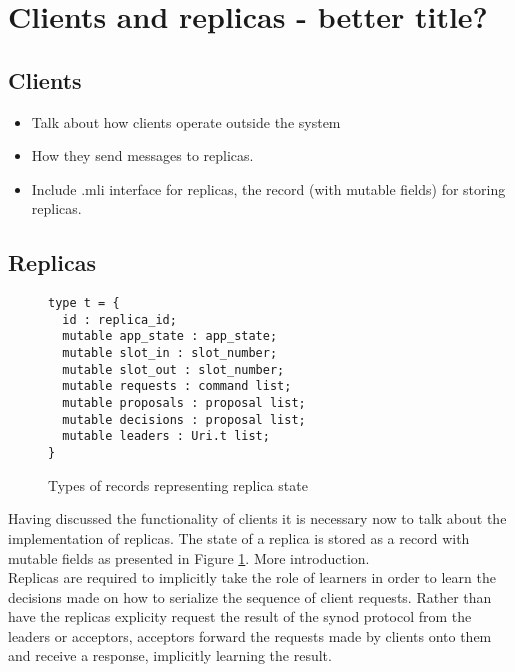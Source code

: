 \section{Clients and replicas - better title?}

{\color{green}
\subsection{Clients}
\begin{itemize}
  \item Talk about how clients operate outside the system
  \item How they send messages to replicas.
  \item Include .mli interface for replicas, the record (with mutable fields) for storing replicas.
\end{itemize}
}

\subsection{Replicas}

\begin{figure}
\begin{lstlisting}
type t = {
  id : replica_id;
  mutable app_state : app_state;
  mutable slot_in : slot_number;
  mutable slot_out : slot_number;
  mutable requests : command list;
  mutable proposals : proposal list;
  mutable decisions : proposal list;
  mutable leaders : Uri.t list;
}
\end{lstlisting}
\centering
\caption{Types of records representing replica state}
\label{fig:replica-types}
\end{figure}

Having discussed the functionality of clients it is necessary now to talk about the implementation of replicas. The state of a replica is stored as a record with mutable fields as presented in Figure \ref{fig:replica-types}. More introduction. \\

Replicas are required to implicitly take the role of learners in order to learn the decisions made on how to serialize the sequence of client requests. Rather than have the replicas explicity request the result of the synod protocol from the leaders or acceptors, acceptors forward the requests made by clients onto them and receive a response, implicitly learning the result. \\

